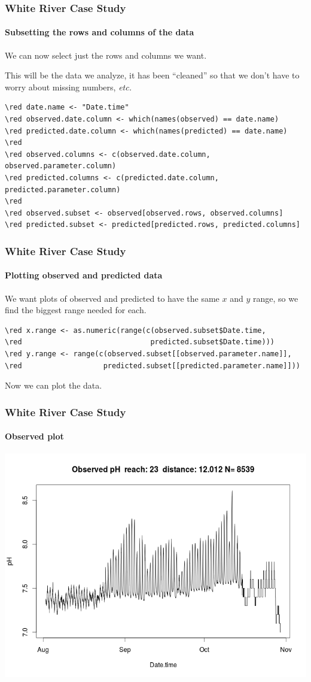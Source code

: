 \documentclass[10pt]{beamer}
\newcommand{\red}{\color{red}}
\newcommand{\iwsframe}[2]{
\begin{frame}[fragile]
\frametitle{#1}
\framesubtitle{#2}
}
\begin{document}
\iwsframe{White River Case Study}{Subsetting the rows and columns of the data}
\bi
\item We can now select just the rows and columns we want.
\item This will be the data we analyze, it has been ``cleaned'' so
  that we don't have to worry about missing numbers, {\em etc.}
\ei
\begin{Verbatim}[fontsize=\scriptsize,commandchars=\\\{\}]
\red date.name <- "Date.time"
\red observed.date.column <- which(names(observed) == date.name)
\red predicted.date.column <- which(names(predicted) == date.name)
\red 
\red observed.columns <- c(observed.date.column, observed.parameter.column)
\red predicted.columns <- c(predicted.date.column, predicted.parameter.column)
\red 
\red observed.subset <- observed[observed.rows, observed.columns]
\red predicted.subset <- predicted[predicted.rows, predicted.columns]
\end{Verbatim}
\end{frame}

\iwsframe{White River Case Study}{Plotting observed and predicted data}
\bi
\item We want plots of observed and predicted to have the same $x$ and
  $y$ range, so we find the biggest range needed for each.
\ei
\begin{Verbatim}[fontsize=\scriptsize,commandchars=\\\{\}]
\red x.range <- as.numeric(range(c(observed.subset$Date.time,
\red                              predicted.subset$Date.time)))
\red y.range <- range(c(observed.subset[[observed.parameter.name]],
\red                   predicted.subset[[predicted.parameter.name]]))
\end{Verbatim}
\bi
\item Now we can plot the data.
\ei
\VerbatimInput[fontsize=\scriptsize,firstline=113,lastline=118,formatcom=\red]{whiteriver01.r}
\end{frame}

\iwsframe{White River Case Study}{Observed plot}
\includegraphics[width=\textwidth]{whiteriverplot01.png}
\end{frame}
\end{document}
